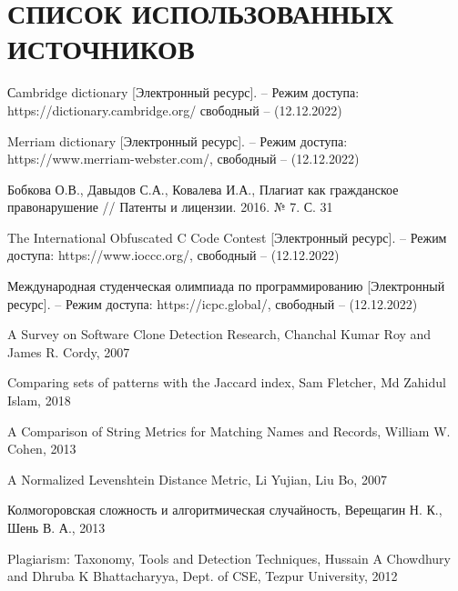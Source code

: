 \section*{СПИСОК ИСПОЛЬЗОВАННЫХ ИСТОЧНИКОВ}

\begingroup
\renewcommand{\section}[2]{}
\begin{thebibliography}{}
	
	
	Сambridge dictionary  [Электронный ресурс]. -- Режим доступа: 
	https://dictionary.cambridge.org/
	свободный -- (12.12.2022)
	
	Merriam dictionary [Электронный ресурс]. -- Режим доступа: 
	https://www.merriam-webster.com/,
	свободный -- (12.12.2022)
	
	Бобкова О.В., Давыдов С.А., Ковалева И.А., 
	Плагиат как гражданское правонарушение //
	Патенты и лицензии. 2016. № 7. С. 31
	
	
	The International Obfuscated C Code Contest  [Электронный ресурс]. -- Режим доступа: 
	https://www.ioccc.org/,
	свободный -- (12.12.2022)
	
	
	Международная студенческая олимпиада по программированию [Электронный ресурс]. -- Режим доступа: 
	https://icpc.global/,
	свободный -- (12.12.2022)
	
	A Survey on Software Clone Detection Research,
	Chanchal Kumar Roy and James R. Cordy,
	2007
	
	
	Comparing sets of patterns with the Jaccard index,
	Sam Fletcher, Md Zahidul Islam,
	2018
	
	A Comparison of String Metrics for Matching Names and Records,
	William W. Cohen,
	2013
	
	A Normalized Levenshtein Distance Metric,
	Li Yujian, Liu Bo,
	2007
	
	
	 Колмогоровская сложность и алгоритмическая случайность,
	 Верещагин Н. К., Шень В. А.,
	 2013	
	 
	 Plagiarism: Taxonomy, Tools and Detection Techniques,
	 Hussain A Chowdhury and Dhruba K Bhattacharyya,
	 Dept. of CSE, Tezpur University,
	 2012
	 

\end{thebibliography}

